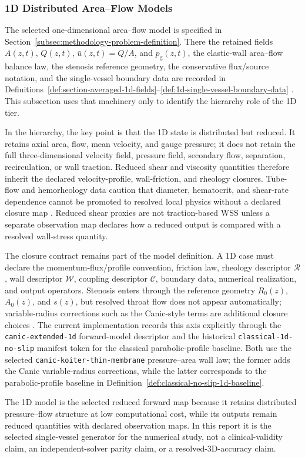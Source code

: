 \subsubsection{1D Distributed Area--Flow Models}
\label{subsubsec:1d-models}

The selected one-dimensional area--flow model is specified in
Section~\ref{subsec:methodology-problem-definition}. There the retained fields
$A(z,t)$, $Q(z,t)$, $\bar u(z,t)=Q/A$, and $p_{\mathrm g}(z,t)$, the
elastic-wall area--flow balance law, the stenosis reference geometry, the
conservative flux/source notation, and the single-vessel boundary data are
recorded in
Definitions~\ref{def:section-averaged-1d-fields}--\ref{def:1d-single-vessel-boundary-data}
\cite{FormaggiaEtAl2003OneDimensionalBloodFlow,KopplHelmig2023DimensionReducedModeling}.
This subsection uses that machinery only to identify the hierarchy role of the
1D tier.

In the hierarchy, the key point is that the 1D state is distributed but reduced.
It retains axial area, flow, mean velocity, and gauge pressure; it does not
retain the full three-dimensional velocity field, pressure field, secondary
flow, separation, recirculation, or wall traction. Reduced shear and viscosity
quantities therefore inherit the declared velocity-profile, wall-friction, and
rheology closures. Tube-flow and hemorheology data caution that diameter,
hematocrit, and shear-rate dependence cannot be promoted to resolved local
physics without a declared closure map
\cite{PriesEtAl1992BloodViscosityTubeFlow,GaldiEtAl2008HemodynamicalFlows}.
Reduced shear proxies are not traction-based WSS unless a separate observation
map declares how a reduced output is compared with a resolved wall-stress
quantity.

The closure contract remains part of the model definition. A 1D case must
declare the momentum-flux/profile convention, friction law, rheology descriptor
$\mathcal R$, wall descriptor $\mathcal W$, coupling descriptor $\mathcal C$,
boundary data, numerical realization, and output operators. Stenosis enters
through the reference geometry $R_0(z)$, $A_0(z)$, and $s(z)$, but resolved
throat flow does not appear automatically; variable-radius corrections such as
the Canic-style terms are additional closure choices
\cite{CanicEtAl2024Extended1DStenosis}.
The current implementation records this axis explicitly through the
\texttt{canic-extended-1d} forward-model descriptor and the historical
\texttt{classical-1d-no-slip} manifest token for the classical
parabolic-profile baseline. Both use the selected
\texttt{canic-koiter-thin-membrane} pressure--area wall law; the former adds
the Canic variable-radius corrections, while the latter corresponds to the
parabolic-profile baseline in
Definition~\ref{def:classical-no-slip-1d-baseline}.

The 1D model is the selected reduced forward map because it retains distributed
pressure--flow structure at low computational cost, while its outputs remain
reduced quantities with declared observation maps. In this report it is the
selected single-vessel generator for the numerical study, not a
clinical-validity claim, an independent-solver parity claim, or a
resolved-3D-accuracy claim.

